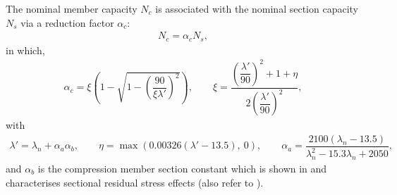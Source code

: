 The nominal member capacity $N_c$ is associated with the nominal section capacity $N_s$ via a reduction factor $\alpha_c$:
\begin{gather}
N_c=\alpha_cN_s,
\end{gather}
in which,
\begin{gather*}
\alpha_c=\xi\left(1-\sqrt{1-\left(\dfrac{90}{\xi\lambda'}\right)^2}\right),\qquad
\xi=\dfrac{\left(\dfrac{\lambda'}{90}\right)^2+1+\eta}{2\left(\dfrac{\lambda'}{90}\right)^2},
\end{gather*}
with
\begin{gather*}
\lambda'=\lambda_n+\alpha_a\alpha_b,\qquad
\eta=\max\left(0.00326\left(\lambda'-13.5\right),~0\right),\qquad
\alpha_a=\dfrac{2100\left(\lambda_n-13.5\right)}{\lambda_n^2-15.3\lambda_n+2050},
\end{gather*}
and $\alpha_b$ is the compression member section constant which is shown in  and characterises sectional residual stress effects (also refer to ).
